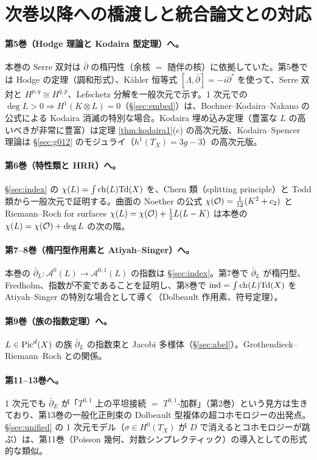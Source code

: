 \section{次巻以降への橋渡しと統合論文との対応}\label{sec:bridge}
\paragraph{第5巻（Hodge 理論と Kodaira 型定理）へ。}本巻の Serre 双対は $\bar\partial$ の楕円性（余核 $=$ 随伴の核）に依拠していた。第5巻では Hodge の定理（調和形式）、Kähler 恒等式 $[\Lambda,\bar\partial]=-i\partial^*$ を使って、Serre 双対と $H^{p,q}\cong\overline{H^{q,p}}$、Lefschetz 分解を一般次元で示す。1 次元での $\deg L>0\Rightarrow H^1(K\otimes L)=0$（§\ref{sec:embed}）は、Bochner--Kodaira--Nakano の公式による Kodaira 消滅の特別な場合。Kodaira 埋め込み定理（豊富な $L$ の高いべきが非常に豊富）は定理 \ref{thm:kodaira1}(c) の高次元版、Kodaira--Spencer 理論は \S\ref{sec:g012} のモジュライ（$h^1(T_X)=3g-3$）の高次元版。
\paragraph{第6巻（特性類と HRR）へ。}§\ref{sec:index} の $\chi(L)=\int\mathrm{ch}(L)\mathrm{Td}(X)$ を、Chern 類（splitting principle）と Todd 類から一般次元で証明する。曲面の Noether の公式 $\chi(\mathcal O)=\frac1{12}(K^2+c_2)$ と Riemann--Roch for surfaces $\chi(L)=\chi(\mathcal O)+\frac12L(L-K)$ は本巻の $\chi(L)=\chi(\mathcal O)+\deg L$ の次の階。
\paragraph{第7--8巻（楕円型作用素と Atiyah--Singer）へ。}本巻の $\bar\partial_L:\mathcal A^0(L)\to\mathcal A^{0,1}(L)$ の指数は \S\ref{sec:index}。第7巻で $\bar\partial_L$ が楕円型、Fredholm、指数が不変であることを証明し、第8巻で $\mathrm{ind}=\int\mathrm{ch}(L)\mathrm{Td}(X)$ を Atiyah--Singer の特別な場合として導く（Dolbeault 作用素、符号定理）。
\paragraph{第9巻（族の指数定理）へ。}$L\in\mathrm{Pic}^d(X)$ の族 $\bar\partial_L$ の指数束と Jacobi 多様体（\S\ref{sec:abel}）。Grothendieck--Riemann--Roch との関係。
\paragraph{第11--13巻へ。}1 次元でも $\bar\partial_E$ が「$T^{0,1}$ 上の平坦接続 $=$ $T^{0,1}$-加群」（第2巻）という見方は生きており、第13巻の一般化正則束の Dolbeault 型複体の超コホモロジーの出発点。§\ref{sec:unified} の 1 次元モデル（$\sigma\in H^0(T_X)$ が $D$ で消えるとコホモロジーが跳ぶ）は、第11巻（Poisson 幾何、対数シンプレクティック）の導入としての形式的な類似。

